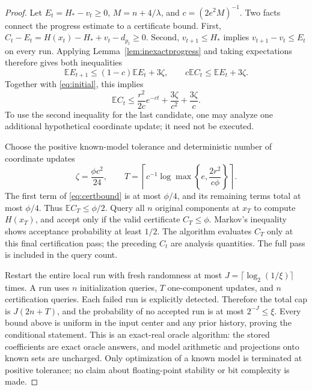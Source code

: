 \documentclass[11pt,a4paper]{article}
\theoremstyle{definition}\newtheorem{definition}[theorem]{Definition}
\theoremstyle{remark}\newtheorem{remark}[theorem]{Remark}
\newcommand{\E}{\mathbb E}
\begin{document}
\begin{proof}
Let $E_t=H_*-v_t\ge0$, $M=n+4/\lambda$, and $c=(2e^2M)^{-1}$.
Two facts connect the progress estimate to a certificate bound. First,
$C_t-E_t=H(x_t)-H_*+v_t-d_{p_t}\ge0$. Second,
$v_{t+1}\le H_*$ implies $v_{t+1}-v_t\le E_t$ on every run.
Applying Lemma~\ref{lem:inexactprogress} and taking expectations therefore
gives both inequalities
\begin{equation}\label{eq:recurrence}
 \E E_{t+1}\le(1-c)\E E_t+3\zeta,\qquad
 c\E C_t\le\E E_t+3\zeta.
\end{equation}
Together with \eqref{eq:initial}, this implies
\begin{equation}\label{eq:certbound}
 \E C_t\le\frac{r^2}{2c}e^{-ct}+\frac{3\zeta}{c^2}
                                      +\frac{3\zeta}{c}.
\end{equation}
To use the second inequality for the last candidate, one may analyze one additional hypothetical coordinate update; it need not be executed.

Choose the positive known-model tolerance and deterministic number of coordinate updates
\begin{equation}\label{eq:localparameters}
 \zeta=\frac{\phi c^2}{24},\qquad
 T=\left\lceil c^{-1}\log\max\left\{e,\frac{2r^2}{c\phi}\right\}\right\rceil.
\end{equation}
The first term of \eqref{eq:certbound} is at most $\phi/4$, and its remaining terms total at most $\phi/4$. Thus $\E C_T\le\phi/2$. Query all $n$ original components at $x_T$ to compute $H(x_T)$, and accept only if the valid certificate $C_T\le\phi$. Markov's inequality shows acceptance probability at least $1/2$. The algorithm evaluates $C_T$ only at this final certification pass;
the preceding $C_t$ are analysis quantities. The full pass is included
in the query count.

Restart the entire local run with fresh randomness at most $J=\lceil\log_2(1/\xi)\rceil$ times. A run uses $n$ initialization queries, $T$ one-component updates, and $n$ certification queries. Each failed run is explicitly detected. Therefore the total cap is $J(2n+T)$, and the probability of no accepted run is at most $2^{-J}\le\xi$. Every bound above is uniform in the input center and any prior history, proving the conditional statement. This is an exact-real oracle algorithm: the stored coefficients are exact oracle answers, and model arithmetic and projections onto known sets are uncharged. Only optimization of a known model is terminated at positive tolerance; no claim about floating-point stability or bit complexity is made.
\end{proof}
\end{document}
